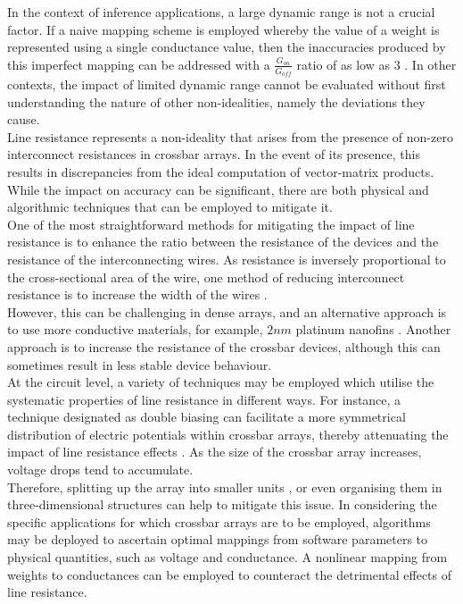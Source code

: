 \noindent In the context of inference applications, a large dynamic range is not a crucial factor. If a naive mapping scheme is employed whereby the value of a weight is represented using a single conductance value, then the inaccuracies produced by this imperfect mapping can be addressed with a $\frac{G_{on}}{G_{off}}$ ratio of as low as 3 \cite{mehonic2019simulation}. In other contexts, the impact of limited dynamic range cannot be evaluated without first understanding the nature of other non-idealities, namely the deviations they cause.\\

\noindent Line resistance represents a non-ideality that arises from the presence of non-zero interconnect resistances in crossbar arrays. In the event of its presence, this results in discrepancies from the ideal computation of vector-matrix products. While the impact on accuracy can be significant, there are both physical and algorithmic techniques that can be employed to mitigate it. \\

\noindent One of the most straightforward methods for mitigating the impact of line resistance is to enhance the ratio between the resistance of the devices and the resistance of the interconnecting wires. As resistance is inversely proportional to the cross-sectional area of the wire, one method of reducing interconnect resistance is to increase the width of the wires \cite{li2017three}.\\

\noindent However, this can be challenging in dense arrays, and an alternative approach is to use more conductive materials, for example, $2nm$ platinum nanofins \cite{pi2019memristor}. Another approach is to increase the resistance of the crossbar devices, although this can sometimes result in less stable device behaviour. \\

\noindent At the circuit level, a variety of techniques may be employed which utilise the systematic properties of line resistance in different ways. For instance, a technique designated as double biasing can facilitate a more symmetrical distribution of electric potentials within crossbar arrays, thereby attenuating the impact of line resistance effects \cite{hu2016dot}. As the size of the crossbar array increases, voltage drops tend to accumulate. \\

\noindent Therefore, splitting up the array into smaller units \cite{xia2016technological}, or even organising them in three-dimensional structures \cite{xia2019memristive} can help to mitigate this issue. In considering the specific applications for which crossbar arrays are to be employed, algorithms may be deployed to ascertain optimal mappings from software parameters to physical quantities, such as voltage and conductance.  A nonlinear mapping from weights to conductances can be employed to counteract the detrimental effects of line resistance. \\

